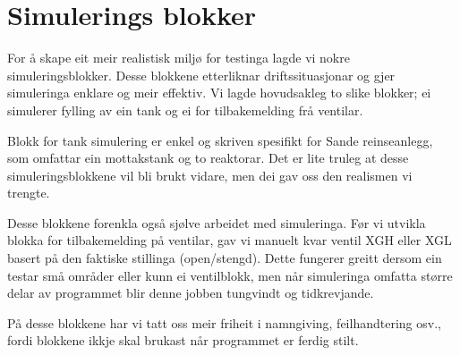 \section{Simulerings blokker}
\thispagestyle{fancy}

For å skape eit meir realistisk miljø for testinga lagde vi nokre simuleringsblokker.
Desse blokkene etterliknar driftssituasjonar og gjer simuleringa enklare og meir effektiv.
Vi lagde hovudsakleg to slike blokker; ei simulerer fylling av ein tank
og ei for tilbakemelding frå ventilar.

Blokk for tank simulering er enkel og skriven spesifikt for Sande reinseanlegg, som omfattar ein mottakstank
og to reaktorar.
Det er lite truleg at desse simuleringsblokkene vil bli brukt vidare, men dei gav
oss den realismen vi trengte.

Desse blokkene forenkla også sjølve arbeidet med simuleringa.
Før vi utvikla blokka for tilbakemelding på ventilar, 
gav vi manuelt kvar ventil \gls{XGH} eller \gls{XGL} basert på den faktiske stillinga (open/stengd).
Dette fungerer greitt dersom ein testar små områder eller kunn ei ventilblokk, men
når simuleringa omfatta større delar av programmet blir denne jobben tungvindt og tidkrevjande.

På desse blokkene har vi tatt oss meir friheit i namngiving, feilhandtering osv.,
fordi blokkene ikkje skal brukast når programmet er ferdig stilt.


